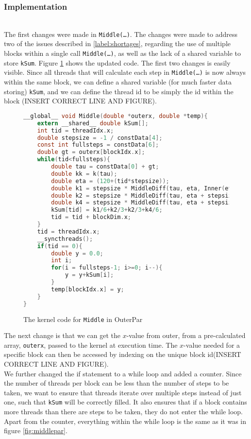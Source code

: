 \subsubsection{Implementation} \hfill \\
The first changes were made in \texttt{Middle(…)}. The changes were made to address two of the issues described in \ref{label:shortages}, regarding the use of multiple blocks within a single call \texttt{Middle(…)}, as well as the lack of a shared variable to store \texttt{kSum}. Figure \ref{fig:outerpar} shows the updated code. The first two changes is easily  visible. Since all threads that will calculate each step in \texttt{Middle(…)} is now always within the same block, we can define a shared variable (for much faster data storing) \texttt{kSum}, and we can define the thread id to be simply the id within the block (INSERT CORRECT LINE AND FIGURE).\\

\begin{figure}[ht]
\begin{lstlisting}[language=c]
__global__ void Middle(double *outerx, double *temp){
	extern __shared__ double kSum[];
	int tid = threadIdx.x;
	double stepsize = -1 / constData[4];
	const int fullsteps = constData[6];
	double gt = outerx[blockIdx.x];
	while(tid<fullsteps){
		double tau = constData[0] + gt;
		double kk = k(tau);
		double eta = (120+(tid*stepsize));
		double k1 = stepsize * MiddleDiff(tau, eta, Inner(eta, gt, kk).y);
		double k2 = stepsize * MiddleDiff(tau, eta + stepsize/2, Inner(eta + stepsize/2, gt, kk).y);		
		double k4 = stepsize * MiddleDiff(tau, eta + stepsize, Inner(eta + stepsize, gt, kk).y);
		kSum[tid] = k1/6+k2/3+k2/3+k4/6;
		tid = tid + blockDim.x;
	}
	tid = threadIdx.x;
	__syncthreads();
	if(tid == 0){
		double y = 0.0;
		int i;
		for(i = fullsteps-1; i>=0; i--){
			y = y+kSum[i];
		}
		temp[blockIdx.x] = y;
	}
}
\end{lstlisting}
\caption{The kernel code for \texttt{Middle} in OuterPar}
\label{fig:outerpar}
\end{figure}

The next change is that we can get the $x$-value from outer, from a pre-calculated array, \texttt{outerx}, passed to the kernel at execution time. The $x$-value needed for a specific block can then be accessed by indexing on the unique block id(INSERT CORRECT LINE AND FIGURE).\\

We further changed the if statement to a while loop and added a counter. Since the number of threads per block can be less than the number of steps to be taken, we want to ensure that threads iterate over multiple steps instead of just one, such that \texttt{kSum} will be correctly filled. It also ensures that if a block contains more threads than there are steps to be taken, they do not enter the while loop. Apart from the counter, everything within the while loop is the same as it was in figure \ref{fig:middlepar}.\\

